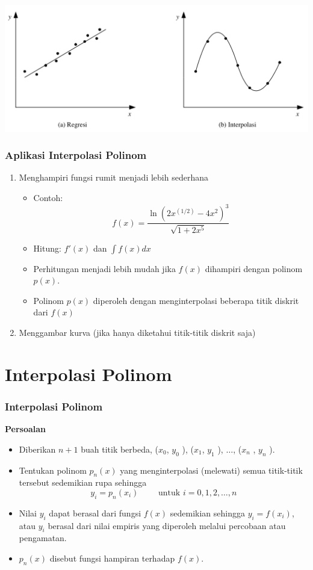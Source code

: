 \documentclass[pdflatex,compress,mathserif]{beamer}
\begin{document}
\begin{frame}
	\begin{center}
		\includegraphics[width=\linewidth]{img/img02}
	\end{center}
\end{frame}

\begin{frame}
	\frametitle{Aplikasi Interpolasi Polinom}
	\begin{enumerate}
		\item Menghampiri fungsi rumit menjadi lebih sederhana
		\begin{itemize}
			\item Contoh: \[ f(x) = \frac{\ln(2x^{(1/2)}-4x^2)^3}{\sqrt{1+2x^5}} \]
			\item[] Hitung: $ f'(x) $ dan $\int f(x) dx$
			\item Perhitungan menjadi lebih mudah jika $ f(x) $ dihampiri dengan polinom $ p(x) $.
			\item Polinom $ p(x) $ diperoleh dengan menginterpolasi beberapa titik diskrit dari $ f(x) $
		\end{itemize}
		\item Menggambar kurva (jika hanya diketahui titik-titik diskrit saja)
	\end{enumerate}
\end{frame}

\section{Interpolasi Polinom}

\begin{frame}
	\frametitle{Interpolasi Polinom}
	\textbf{Persoalan}
	\begin{itemize}
		\item Diberikan $ n+1 $ buah titik berbeda, ($ x_0 $, $ y_0 $ ), ($ x_1 $, $ y_1 $ ), $\dots$, ($ x_n $ , $ y_n $ ).
		\item Tentukan polinom $ p_n(x) $ yang menginterpolasi (melewati) semua titik-titik tersebut sedemikian rupa sehingga
		\[ y_i = p_n(x_i)\qquad \text{ untuk } i = 0,1,2,\dots,n \]
		\item Nilai $ y_i $ dapat berasal dari fungsi $ f(x) $ sedemikian sehingga $ y_i = f(x_i) $, atau $ y_i $ berasal dari nilai empiris yang diperoleh melalui percobaan atau pengamatan.
		\item $ p_n(x) $ disebut fungsi hampiran terhadap $ f(x) $.
	\end{itemize}
\end{frame}
\end{document}
